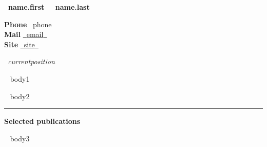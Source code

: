 \documentclass[a4paper]{article}
\newcommand{\block}[1]{\hrule \vspace{0.2cm} \textbf{\Large #1} \vspace{0.2cm}}
\newcommand{\skill}[2]{\textbf{#1} \hfill #2 \\}
\begin{document}
\begin{minipage}[c]{0.6\columnwidth}
    \centering
    \huge \textbf{~{{name.first}}~ ~{{name.last}}~}
\end{minipage} 
\hfill
\begin{minipage}[t]{0.375\columnwidth}
    \skill{Phone}{~{{phone}}~}
    \skill{Mail}{\href{mailto:~{{email}}~}{~{{email}}~}}
    \skill{Site}{\href{~{{site}}~}{~{{site}}~}}
\end{minipage}
\textit{~{{currentposition}}~}



\begin{minipage}[t]{0.6\columnwidth}
    ~{{ body1 }}~
\end{minipage} 
\hfill
\begin{minipage}[t]{0.375\columnwidth}
    ~{{ body2 }}~
\end{minipage}

\newpage
\block{Selected publications}
\nocite{*}
\printbibliography[heading=none]

~{{ body3 }}~
\end{document}
